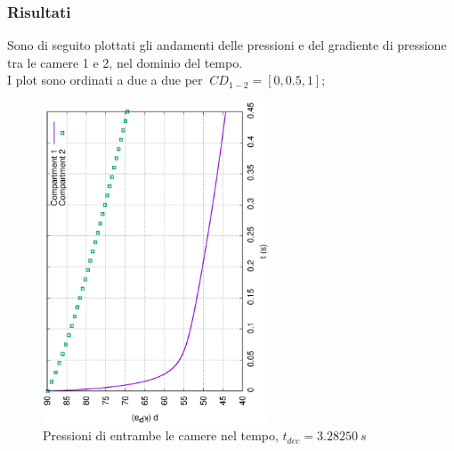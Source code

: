 \documentclass{article}
\begin{document}
        \subsubsection{Risultati}
        Sono di seguito plottati gli andamenti delle pressioni e del 
        gradiente di pressione tra le camere 1 e 2, nel dominio del tempo. \\ 
        I plot sono ordinati a due a due per $\ CD_{1-2} = [0, 0.5, 1];$ \

        \begin{figure}[h!]
            \centering
            \label{fig:press_cam_0}
            \includegraphics[width=0.6\textwidth, angle=-90]{MUL2/Esercitazione1/1A/p.eps}
            \caption{Pressioni di entrambe le camere nel tempo, $t_{dec} = 3.28250 \ s$}
        \end{figure}
\end{document}
